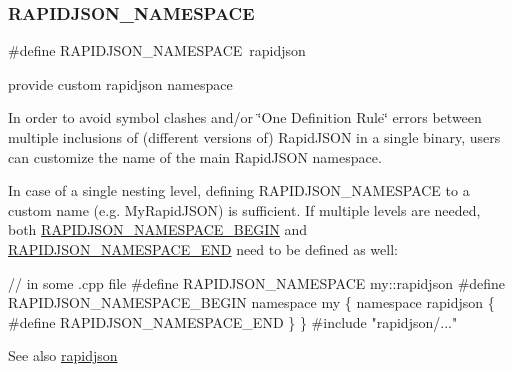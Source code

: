 \subsubsection{\texorpdfstring{R\+A\+P\+I\+D\+J\+S\+O\+N\+\_\+\+N\+A\+M\+E\+S\+P\+A\+CE}{RAPIDJSON\_NAMESPACE}\hspace{0.1cm}{\footnotesize\ttfamily [1/2]}}
{\footnotesize\ttfamily \#define R\+A\+P\+I\+D\+J\+S\+O\+N\+\_\+\+N\+A\+M\+E\+S\+P\+A\+CE~rapidjson}



provide custom rapidjson namespace 

In order to avoid symbol clashes and/or \char`\"{}\+One Definition Rule\char`\"{} errors between multiple inclusions of (different versions of) Rapid\+J\+S\+ON in a single binary, users can customize the name of the main Rapid\+J\+S\+ON namespace.

In case of a single nesting level, defining {\ttfamily R\+A\+P\+I\+D\+J\+S\+O\+N\+\_\+\+N\+A\+M\+E\+S\+P\+A\+CE} to a custom name (e.\+g. {\ttfamily My\+Rapid\+J\+S\+ON}) is sufficient. If multiple levels are needed, both \hyperlink{group__RAPIDJSON__CONFIG_gad3806c8251fdc7da9618b7e922674ffc}{R\+A\+P\+I\+D\+J\+S\+O\+N\+\_\+\+N\+A\+M\+E\+S\+P\+A\+C\+E\+\_\+\+B\+E\+G\+IN} and \hyperlink{group__RAPIDJSON__CONFIG_gaf18f052a98b9f5df5448d39484b743c1}{R\+A\+P\+I\+D\+J\+S\+O\+N\+\_\+\+N\+A\+M\+E\+S\+P\+A\+C\+E\+\_\+\+E\+ND} need to be defined as well\+:


\begin{DoxyCode}
\textcolor{comment}{// in some .cpp file}
\textcolor{preprocessor}{#define RAPIDJSON\_NAMESPACE my::rapidjson}
\textcolor{preprocessor}{#define RAPIDJSON\_NAMESPACE\_BEGIN namespace my \{ namespace rapidjson \{}
\textcolor{preprocessor}{#define RAPIDJSON\_NAMESPACE\_END   \} \}}
\textcolor{preprocessor}{#include "rapidjson/..."}
\end{DoxyCode}


\begin{DoxySeeAlso}{See also}
\hyperlink{namespacerapidjson}{rapidjson} 
\end{DoxySeeAlso}
\mbox{\label{group__RAPIDJSON__CONFIG_ga743a79d3af927391fe3eb5c979136899}} 
